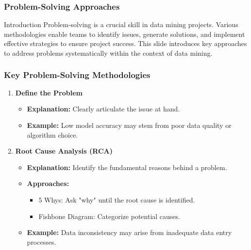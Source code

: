 \documentclass{beamer}
\begin{document}
\begin{frame}[fragile]
    \frametitle{Problem-Solving Approaches}
    \begin{block}{Introduction}
        Problem-solving is a crucial skill in data mining projects. Various methodologies enable teams to identify issues, generate solutions, and implement effective strategies to ensure project success. This slide introduces key approaches to address problems systematically within the context of data mining.
    \end{block}
\end{frame}

\begin{frame}[fragile]
    \frametitle{Key Problem-Solving Methodologies}
    \begin{enumerate}
        \item \textbf{Define the Problem}
            \begin{itemize}
                \item \textbf{Explanation:} Clearly articulate the issue at hand.
                \item \textbf{Example:} Low model accuracy may stem from poor data quality or algorithm choice.
            \end{itemize}
        
        \item \textbf{Root Cause Analysis (RCA)}
            \begin{itemize}
                \item \textbf{Explanation:} Identify the fundamental reasons behind a problem.
                \item \textbf{Approaches:}
                    \begin{itemize}
                        \item 5 Whys: Ask "why" until the root cause is identified.
                        \item Fishbone Diagram: Categorize potential causes.
                    \end{itemize}
                \item \textbf{Example:} Data inconsistency may arise from inadequate data entry processes.
            \end{itemize}
    \end{enumerate}
\end{frame}
\end{document}
